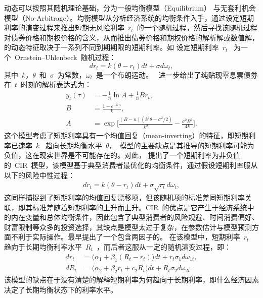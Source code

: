 动态\tsm 可以按照其随机理论基础，分为一般均衡模型（Equilibrium） 与无套利机会模型（No-Arbitrage）。均衡模型从分析经济系统的均衡条件入手，通过设定短期利率的演变过程来推出短期无风险利率~$r_t$~的一个随机过程，然后寻找该随机过程对债券价格和期权价格的含义，从而推出债券价格和期权价格的解析解或数值解，\ts 的动态特征取决于一系列不同到期期限的短期利率。如 设定短期利率~$r_t$~ 为一个~Ornstein–Uhlenbeck~随机过程：
\begin{equation}
  dr_t = k(\theta-r_t)dt + \sigma d \omega_t,
\end{equation}
其中~$k$，$\theta$~和~$\sigma$~为常数，$\omega_t$~是一个布朗运动。\citeauthor{vasicek1977equilibrium}~ 进一步给出了纯贴现零息票债券在~$t$~时刻的解析表达式为：
\begin{align*}
  y_t{(\tau)} &= -\frac{1}{n}\ln A + \frac{1}{n} B r_t,\\
  B &= \frac{1-e^{-k\,n}}{k},\\
  A &= \exp{\big[
       \frac{(B-n)(k^2 \theta -\sigma^2/2)}{k^2}
       - \frac{\sigma^2 B^2}{4k}
              \big]}.
\end{align*}
这个模型考虑了短期利率具有一个均值回复（mean-inverting）的特征，即短期利率已速率~$k$~ 趋向长期均衡水平~$\theta$，\citeauthor{vasicek1977equilibrium}~模型的主要缺点是其推导的短期利率可能为负值，这在现实世界是不可能存在的。对此， 提出了一个短期利率为非负值的~CIR~模型，该模型基于典型消费者最优化的均衡条件，通过假设短期利率服从以下的风险中性过程：
\begin{align}
  dr_t = k(\theta-r_t)dt + \sigma \sqrt{r_t} d \omega_t,
\end{align}
这同样捕捉到了短期利率的均值回复漂移项，但该随机项的标准差同短期利率关联，即其标准差随着短期利率的上升而上升。CIR~\tsm 的优点是它产生于经济系统中的内在变量和总体均衡条件，因此包含了典型消费者的风险规避、时间消费偏好、财富限制等众多的投资选择，其缺点是模型太过于复杂，在参数估计与模型预测方面不利于实际操作。最早提出了一个包含两因子的\tsm{}。 在该模型中，短期利率~$r_t$~ 趋向于长期均衡利率水平~$R_t$~，而后者这服从一定的随机演变过程，即：
\begin{align*}
  dr_t &= \big(\alpha_1+\beta_1(R_t-r_t)\big)dt + r_t \sigma_1 d \omega_{1t}, \\
  dR_t &= \big(\alpha_2+\beta_2r_t+c_2 R_t\big)dt + R_t \sigma_2 d \omega_{2t}.
\end{align*}
该模型的缺点在于没有清楚的解释短期利率为何趋向于长期利率，即什么经济因素决定了长期均衡状态下的利率水平。


